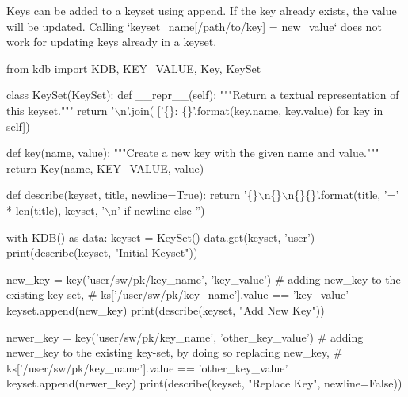 Keys can be added to a keyset using {\ttfamily append}. If the key already exists, the value will be updated. Calling `keyset\+\_\+name\mbox{[}\textquotesingle{}/path/to/key\textquotesingle{}\mbox{]} = \textquotesingle{}new\+\_\+value` does not work for updating keys already in a keyset.


\begin{DoxyCode}
\textcolor{keyword}{from} kdb \textcolor{keyword}{import} KDB, KEY\_VALUE, Key, KeySet


\textcolor{keyword}{class }KeySet(KeySet):
    \textcolor{keyword}{def }\_\_repr\_\_(self):
        \textcolor{stringliteral}{"""Return a textual representation of this keyset."""}
        \textcolor{keywordflow}{return} \textcolor{stringliteral}{'\(\backslash\)n'}.join(
            [\textcolor{stringliteral}{'\{\}: \{\}'}.format(key.name, key.value) \textcolor{keywordflow}{for} key \textcolor{keywordflow}{in} self])


\textcolor{keyword}{def }key(name, value):
    \textcolor{stringliteral}{"""Create a new key with the given name and value."""}
    \textcolor{keywordflow}{return} Key(name, KEY\_VALUE, value)


\textcolor{keyword}{def }describe(keyset, title, newline=True):
    \textcolor{keywordflow}{return} \textcolor{stringliteral}{'\{\}\(\backslash\)n\{\}\(\backslash\)n\{\}\{\}'}.format(title, \textcolor{stringliteral}{'='} * len(title), keyset,
                                 \textcolor{stringliteral}{'\(\backslash\)n'} \textcolor{keywordflow}{if} newline \textcolor{keywordflow}{else} \textcolor{stringliteral}{''})


with KDB() \textcolor{keyword}{as} data:
    keyset = KeySet()
    data.get(keyset, \textcolor{stringliteral}{'user'})
    print(describe(keyset, \textcolor{stringliteral}{"Initial Keyset"}))

    new\_key = key(\textcolor{stringliteral}{'user/sw/pk/key\_name'}, \textcolor{stringliteral}{'key\_value'})
    \textcolor{comment}{# adding new\_key to the existing key-set,}
    \textcolor{comment}{# ks['/user/sw/pk/key\_name'].value == 'key\_value'}
    keyset.append(new\_key)
    print(describe(keyset, \textcolor{stringliteral}{"Add New Key"}))

    newer\_key = key(\textcolor{stringliteral}{'user/sw/pk/key\_name'}, \textcolor{stringliteral}{'other\_key\_value'})
    \textcolor{comment}{# adding newer\_key to the existing key-set, by doing so replacing new\_key,}
    \textcolor{comment}{# ks['/user/sw/pk/key\_name'].value == 'other\_key\_value'}
    keyset.append(newer\_key)
    print(describe(keyset, \textcolor{stringliteral}{"Replace Key"}, newline=\textcolor{keyword}{False}))
\end{DoxyCode}
 
